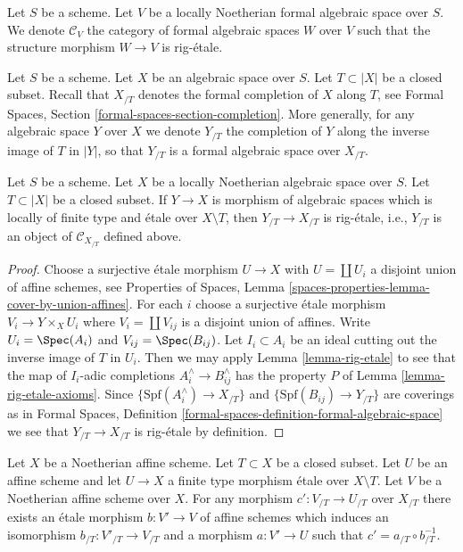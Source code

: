 \medskip\noindent
Let $S$ be a scheme. Let $V$ be a locally Noetherian formal algebraic space
over $S$. We denote $\mathcal{C}_V$ the category of formal algebraic
spaces $W$ over $V$ such that the structure morphism $W \to V$ is rig-\'etale.

\medskip\noindent
Let $S$ be a scheme. Let $X$ be an algebraic space over $S$.
Let $T \subset |X|$ be a closed subset. Recall that $X_{/T}$ denotes
the formal completion of $X$ along $T$, see 
Formal Spaces, Section \ref{formal-spaces-section-completion}.
More generally, for any algebraic space $Y$ over $X$ we
denote $Y_{/T}$ the completion of $Y$ along the inverse
image of $T$ in $|Y|$, so that $Y_{/T}$ is a formal algebraic space
over $X_{/T}$.

\begin{lemma}
\label{lemma-etale-gives-rig-etale}
Let $S$ be a scheme. Let $X$ be a locally Noetherian algebraic space over $S$.
Let $T \subset |X|$ be a closed subset. If $Y \to X$ is morphism of
algebraic spaces which is locally of finite type and \'etale over
$X \setminus T$, then $Y_{/T} \to X_{/T}$ is rig-\'etale, i.e., $Y_{/T}$
is an object of $\mathcal{C}_{X_{/T}}$ defined above.
\end{lemma}

\begin{proof}
Choose a surjective \'etale morphism $U \to X$ with $U = \coprod U_i$
a disjoint union of affine schemes, see Properties of Spaces, Lemma
\ref{spaces-properties-lemma-cover-by-union-affines}.
For each $i$ choose a surjective \'etale morphism $V_i \to Y \times_X U_i$
where $V_i = \coprod V_{ij}$ is a disjoint union of affines.
Write $U_i = \Spec(A_i)$ and $V_{ij} = \Spec(B_{ij})$.
Let $I_i \subset A_i$ be an ideal cutting out the inverse image
of $T$ in $U_i$. Then we may apply
Lemma \ref{lemma-rig-etale}
to see that the map of $I_i$-adic completions
$A_i^\wedge \to B_{ij}^\wedge$ has the property
$P$ of Lemma \ref{lemma-rig-etale-axioms}.
Since $\{\text{Spf}(A_i^\wedge) \to X_{/T}\}$ and
$\{\text{Spf}(B_{ij}) \to Y_{/T}\}$ are coverings as in
Formal Spaces, Definition
\ref{formal-spaces-definition-formal-algebraic-space}
we see that $Y_{/T} \to X_{/T}$ is rig-\'etale by definition.
\end{proof}

\begin{lemma}
\label{lemma-algebraize-morphism-rig-etale}
Let $X$ be a Noetherian affine scheme. Let $T \subset X$ be a closed subset.
Let $U$ be an affine scheme and let $U \to X$ a finite type morphism
\'etale over $X \setminus T$. Let $V$ be a Noetherian affine scheme over $X$.
For any morphism $c' : V_{/T} \to U_{/T}$ over $X_{/T}$ there exists
an \'etale morphism $b : V' \to V$ of affine schemes which induces an
isomorphism $b_{/T} : V'_{/T} \to V_{/T}$ and a morphism $a : V' \to U$
such that $c' = a_{/T} \circ b_{/T}^{-1}$.
\end{lemma}

